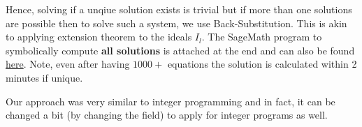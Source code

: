 \documentclass[a4paper,11pt]{article}
\begin{document}
Hence, solving if a unqiue solution exists is trivial but if more than one solutions are possible then to solve such a system, we use Back-Substitution. This is akin to applying extension theorem to the ideals $I_{l}$.
The SageMath program to symbolically compute \textbf{all solutions} is attached at the end and can also be found \href{https://github.com/paramrathour/Groebner-Basis-Applications/blob/main/Sudoku Solver.ipynb}{here}. Note, even after having $1000+$ equations the solution is calculated within 2 minutes if unique.
\begin{note}
    Our approach was very similar to integer programming and in fact, it can be changed a bit (by changing the field) to apply for integer programs as well. 
\end{note}
\nocite{*}
% 
% 
\printbibliography
\end{document}
